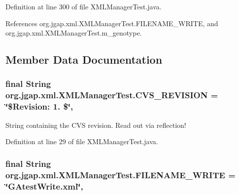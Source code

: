 Definition at line 300 of file X\-M\-L\-Manager\-Test.\-java.



References org.\-jgap.\-xml.\-X\-M\-L\-Manager\-Test.\-F\-I\-L\-E\-N\-A\-M\-E\-\_\-\-W\-R\-I\-T\-E, and org.\-jgap.\-xml.\-X\-M\-L\-Manager\-Test.\-m\-\_\-genotype.



\subsection{Member Data Documentation}
\hypertarget{classorg_1_1jgap_1_1xml_1_1_x_m_l_manager_test_a940671372da769c848bda96e8d22e92e}{
\subsubsection[{C\-V\-S\-\_\-\-R\-E\-V\-I\-S\-I\-O\-N}]{\setlength{\rightskip}{0pt plus 5cm}final String org.\-jgap.\-xml.\-X\-M\-L\-Manager\-Test.\-C\-V\-S\-\_\-\-R\-E\-V\-I\-S\-I\-O\-N = \char`\"{}\$Revision\-: 1. \$\char`\"{}\hspace{0.3cm}{\ttfamily [static]}, {\ttfamily [private]}}}\label{classorg_1_1jgap_1_1xml_1_1_x_m_l_manager_test_a940671372da769c848bda96e8d22e92e}
String containing the C\-V\-S revision. Read out via reflection! 

Definition at line 29 of file X\-M\-L\-Manager\-Test.\-java.

\hypertarget{classorg_1_1jgap_1_1xml_1_1_x_m_l_manager_test_a1a7b12fbeab2cdf56a65268c93c8998d}{
\subsubsection[{F\-I\-L\-E\-N\-A\-M\-E\-\_\-\-W\-R\-I\-T\-E}]{\setlength{\rightskip}{0pt plus 5cm}final String org.\-jgap.\-xml.\-X\-M\-L\-Manager\-Test.\-F\-I\-L\-E\-N\-A\-M\-E\-\_\-\-W\-R\-I\-T\-E = \char`\"{}G\-Atest\-Write.\-xml\char`\"{}\hspace{0.3cm}{\ttfamily [static]}, {\ttfamily [private]}}}\label{classorg_1_1jgap_1_1xml_1_1_x_m_l_manager_test_a1a7b12fbeab2cdf56a65268c93c8998d}


